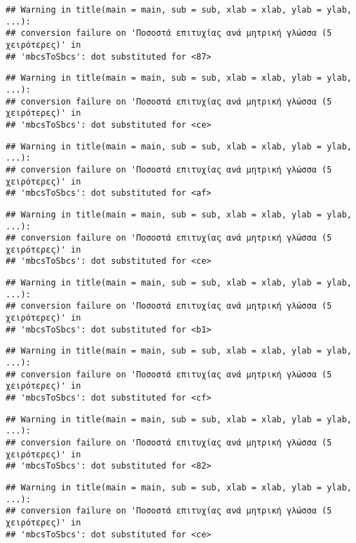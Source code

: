\documentclass[
]{article}
\begin{document}
\begin{verbatim}
## Warning in title(main = main, sub = sub, xlab = xlab, ylab = ylab, ...):
## conversion failure on 'Ποσοστά επιτυχίας ανά μητρική γλώσσα (5 χειρότερες)' in
## 'mbcsToSbcs': dot substituted for <87>
\end{verbatim}

\begin{verbatim}
## Warning in title(main = main, sub = sub, xlab = xlab, ylab = ylab, ...):
## conversion failure on 'Ποσοστά επιτυχίας ανά μητρική γλώσσα (5 χειρότερες)' in
## 'mbcsToSbcs': dot substituted for <ce>
\end{verbatim}

\begin{verbatim}
## Warning in title(main = main, sub = sub, xlab = xlab, ylab = ylab, ...):
## conversion failure on 'Ποσοστά επιτυχίας ανά μητρική γλώσσα (5 χειρότερες)' in
## 'mbcsToSbcs': dot substituted for <af>
\end{verbatim}

\begin{verbatim}
## Warning in title(main = main, sub = sub, xlab = xlab, ylab = ylab, ...):
## conversion failure on 'Ποσοστά επιτυχίας ανά μητρική γλώσσα (5 χειρότερες)' in
## 'mbcsToSbcs': dot substituted for <ce>
\end{verbatim}

\begin{verbatim}
## Warning in title(main = main, sub = sub, xlab = xlab, ylab = ylab, ...):
## conversion failure on 'Ποσοστά επιτυχίας ανά μητρική γλώσσα (5 χειρότερες)' in
## 'mbcsToSbcs': dot substituted for <b1>
\end{verbatim}

\begin{verbatim}
## Warning in title(main = main, sub = sub, xlab = xlab, ylab = ylab, ...):
## conversion failure on 'Ποσοστά επιτυχίας ανά μητρική γλώσσα (5 χειρότερες)' in
## 'mbcsToSbcs': dot substituted for <cf>
\end{verbatim}

\begin{verbatim}
## Warning in title(main = main, sub = sub, xlab = xlab, ylab = ylab, ...):
## conversion failure on 'Ποσοστά επιτυχίας ανά μητρική γλώσσα (5 χειρότερες)' in
## 'mbcsToSbcs': dot substituted for <82>
\end{verbatim}

\begin{verbatim}
## Warning in title(main = main, sub = sub, xlab = xlab, ylab = ylab, ...):
## conversion failure on 'Ποσοστά επιτυχίας ανά μητρική γλώσσα (5 χειρότερες)' in
## 'mbcsToSbcs': dot substituted for <ce>
\end{verbatim}
\end{document}
